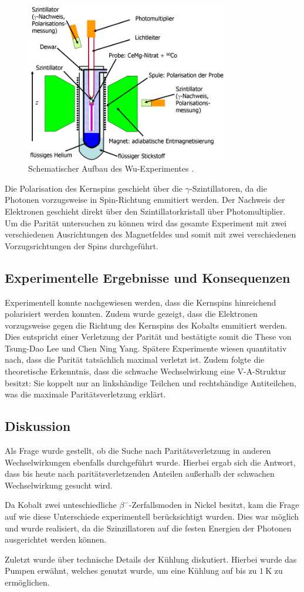 \begin{figure}
  \centering
  \includegraphics[height=7.0cm]{ressources/wu.png}
  \caption{Schematischer Aufbau des Wu-Experimentes \cite{wu}.}
  \label{fig:wu}
\end{figure}

Die Polarisation des Kernspins geschieht über die $\gamma$-Szintillatoren, da die Photonen vorzugsweise in Spin-Richtung emmitiert werden.
Der Nachweis der Elektronen geschieht direkt über den Szintillatorkristall über Photomultiplier.
Um die Parität untersuchen zu können wird das gesamte Experiment mit zwei verschiedenen Ausrichtungen des Magnetfeldes und somit mit zwei verschiedenen Vorzugsrichtungen der Spins durchgeführt.

\subsection{Experimentelle Ergebnisse und Konsequenzen}
Experimentell konnte nachgewiesen werden, dass die Kernspins hinreichend polarisiert werden konnten.
Zudem wurde gezeigt, dass die Elektronen vorzugsweise gegen die Richtung des Kernspins des Kobalts emmitiert werden.
Dies entspricht einer Verletzung der Parität und bestätigte somit die These von Tsung-Dao Lee und Chen Ning Yang.
Spätere Experimente wiesen quantitativ nach, dass die Parität tatsächlich maximal verletzt ist.
Zudem folgte die theoretische Erkenntnis, dass die schwache Wechselwirkung eine V-A-Struktur besitzt:
Sie koppelt nur an linkshändige Teilchen und rechtshändige Antiteilchen, was die maximale Paritätsverletzung erklärt.

\subsection{Diskussion}
Als Frage wurde gestellt, ob die Suche nach Paritätsverletzung in anderen Wechselwirkungen ebenfalls durchgeführt wurde.
Hierbei ergab sich die Antwort, dass bis heute nach paritätsverletzenden Anteilen außerhalb der schwachen Wechselwirkung gesucht wird.

Da Kobalt zwei unteschiedliche $\beta^-$-Zerfallsmoden in Nickel besitzt, kam die Frage auf wie diese Unterschiede experimentell berücksichtigt wurden.
Dies war möglich und wurde realisiert, da die Szinzillatoren auf die festen Energien der Photonen ausgerichtet werden können.

Zuletzt wurde über technische Details der Kühlung diskutiert.
Hierbei wurde das Pumpen erwähnt, welches genutzt wurde, um eine Kühlung auf bis zu $\SI{1}{\kelvin}$ zu ermöglichen.
